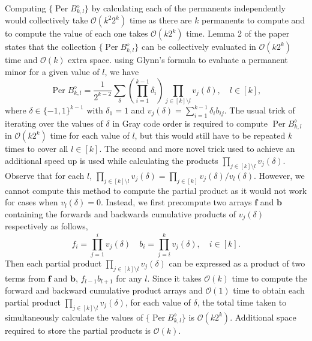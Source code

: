 \documentclass[11pt]{article}
\theoremstyle{theorem}
\theoremstyle{theorem}
\theoremstyle{remark}
\theoremstyle{note}
\theoremstyle{plain}
\theoremstyle{definition}
\DeclareMathOperator*{\Per}{\mathrm{Per}}
\begin{document}
Computing $\{ \Per B_{k, l}^{\diamond} \}$ by calculating each of the permanents independently would collectively take $\mathcal{O}(k^2 2^k)$ time as there are $k$ permanents to compute and to compute the value of each one takes $\mathcal{O}(k 2^k)$ time. Lemma 2 of the paper states that the collection $\{ \Per B_{k, l}^{\diamond} \}$ can be collectively evaluated in $\mathcal{O}(k 2^k)$ time and $\mathcal{O}(k)$ extra space. using Glynn's formula to evaluate a permanent minor for a given value of $l$, we have
\begin{equation}
\Per B_{k, l}^{\diamond} = \frac{1}{2^{k-2}} \sum_\delta \left( \prod_{i=1}^{k-1} \delta_i \right) \prod_{j \in [k] \setminus l} v_j (\delta), \quad l \in [k],
\end{equation}
where $\delta \in \{-1, 1\}^{k-1}$ with $\delta_1 = 1$ and $v_j (\delta) = \sum_{i=1}^{k-1} \delta_i b_{ij}$.
The usual trick of iterating over the values of $\delta$ in Gray code order is required to compute $\Per B_{k, l}^{\diamond}$ in $\mathcal{O}(k2^k)$ time for each value of $l$, but this would still have to be repeated $k$ times to cover all $l \in [k]$. The second and more novel trick used to achieve an additional speed up is used while calculating the products $\prod_{j \in [k] \setminus l} v_j (\delta)$. Observe that for each $l$, $\prod_{j \in [k] \setminus l} v_j (\delta) = \prod_{j \in [k]} v_j (\delta) / v_l(\delta)$. However, we cannot compute this method to compute the partial product as it would not work for cases when $v_l(\delta) = 0$. Instead, we first precompute two arrays $\mathbf{f}$ and $\mathbf{b}$ containing the forwards and backwards cumulative products of $v_j(\delta)$ respectively as follows,
\begin{equation}
f_i = \prod_{j=1}^i v_j(\delta) \quad b_i = \prod_{j=i}^k v_j(\delta), \quad i \in [k].
\end{equation}
Then each partial product $\prod_{j \in [k] \setminus l} v_j (\delta)$ can be expressed as a product of two terms from $\mathbf{f}$ and $\mathbf{b}$, $f_{l-1} b_{l+1}$ for any $l$. Since it takes $\mathcal{O}(k)$ time to compute the forward and backward cumulative product arrays and $\mathcal{O}(1)$ time to obtain each partial product $\prod_{j \in [k] \setminus l} v_j (\delta)$, for each value of $\delta$, the total time taken to simultaneously calculate the values of $\{ \Per B_{k, l}^{\diamond} \}$ is $\mathcal{O}(k2^k)$. Additional space required to store the partial products is $\mathcal{O}(k)$.
\end{document}
